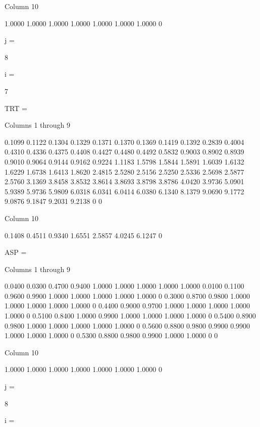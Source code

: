   Column 10

    1.0000
    1.0000
    1.0000
    1.0000
    1.0000
    1.0000
    1.0000
         0


j =

     8


i =

     7


TRT =

  Columns 1 through 9

    0.1099    0.1122    0.1304    0.1329    0.1371    0.1370    0.1369    0.1419    0.1392
    0.2839    0.4004    0.4310    0.4336    0.4375    0.4408    0.4427    0.4480    0.4492
    0.5832    0.9003    0.8902    0.8939    0.9010    0.9064    0.9144    0.9162    0.9224
    1.1183    1.5798    1.5844    1.5891    1.6039    1.6132    1.6229    1.6738    1.6413
    1.8620    2.4815    2.5280    2.5156    2.5250    2.5336    2.5698    2.5877    2.5760
    3.1369    3.8458    3.8532    3.8614    3.8693    3.8798    3.8786    4.0420    3.9736
    5.0901    5.9389    5.9736    5.9809    6.0318    6.0341    6.0414    6.0380    6.1340
    8.1379    9.0690    9.1772    9.0876    9.1847    9.2031    9.2138         0         0

  Column 10

    0.1408
    0.4511
    0.9340
    1.6551
    2.5857
    4.0245
    6.1247
         0


ASP =

  Columns 1 through 9

    0.0400    0.0300    0.4700    0.9400    1.0000    1.0000    1.0000    1.0000    1.0000
    0.0100    0.1100    0.9600    0.9900    1.0000    1.0000    1.0000    1.0000    1.0000
         0    0.3000    0.8700    0.9800    1.0000    1.0000    1.0000    1.0000    1.0000
         0    0.4400    0.9000    0.9700    1.0000    1.0000    1.0000    1.0000    1.0000
         0    0.5100    0.8400    1.0000    0.9900    1.0000    1.0000    1.0000    1.0000
         0    0.5400    0.8900    0.9800    1.0000    1.0000    1.0000    1.0000    1.0000
         0    0.5600    0.8800    0.9800    0.9900    0.9900    1.0000    1.0000    1.0000
         0    0.5300    0.8800    0.9800    0.9900    1.0000    1.0000         0         0

  Column 10

    1.0000
    1.0000
    1.0000
    1.0000
    1.0000
    1.0000
    1.0000
         0


j =

     8


i =

